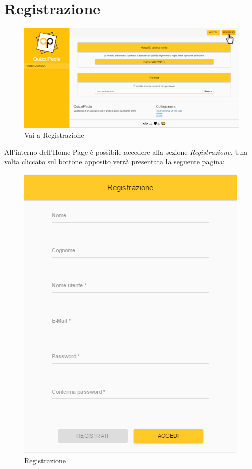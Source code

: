 \newpage
\section{Registrazione}

\label{Registrazione}
\begin{figure}[ht]
	\centering
	\includegraphics[scale=0.33]{img/vai_registrazione.png}
	\caption{Vai a Registrazione}
\end{figure}
\FloatBarrier

All'interno dell'Home Page è possibile accedere alla sezione \textit{Registrazione}. Una volta cliccato sul bottone apposito verrà presentata la seguente pagina:

\label{Registrazione_1}
\begin{figure}[ht]
	\centering
	\includegraphics[scale=0.60]{img/registrazione.png}
	\caption{Registrazione}
\end{figure}
\FloatBarrier


